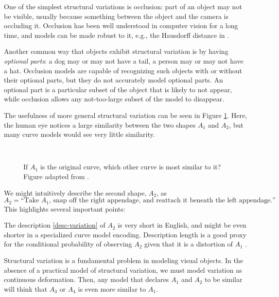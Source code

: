 \documentclass{article}
\begin{document}
One of the simplest structural variations is occlusion: part of an
object may not be visible, usually because something between the
object and the camera is occluding it. Occlusion has been well
understood in computer vision for a long time, and models can be made
robust to it, e.g., the Hausdorff distance in \cite{hausdorff}. 

Another common way that objects exhibit structural variation is by
having \emph{optional parts}: a dog may or may not have a tail, a
person may or may not have a hat. Occlusion models are capable of
recognizing such objects with or without their optional parts, but
they do not accurately model optional parts. An optional part is a
particular subset of the object that is likely to not appear, while
occlusion allows any not-too-large subset of the model to disappear.

The usefulness of more general structural variation can be seen in
Figure \ref{fig-variation}. Here, the human eye notices a large
similarity between the two shapes $A_1$ and $A_2$, but many curve
models would see very little similarity.

\begin{figure}
  \centering
{}
\\
\caption{If $A_1$ is the original curve, which other curve is most
  similar to it? Figure adapted from \cite{basri-jacobs}.}
\label{fig-variation}
\end{figure}

We might intuitively describe the second shape, $A_2$, as
$$ A_2 =\mbox{``Take $A_1$, snap off the right appendage, and reattach
  it beneath the left appendage.''}. \label{desc-variation}$$ 
This highlights several important points:

The description \ref{desc-variation} of $A_2$ is very short in
English, and might be even shorter in a specialized curve model
encoding. Description length is a good proxy for the conditional
probability of observing $A_2$ given that it is a distortion of $A_1$
\cite{potter-geman-bienenstock}.

Structural variation is a fundamental problem in modeling visual
objects. In the absence of a practical model of structural variation,
we must model variation as continuous deformation. Then, any model
that declares $A_1$ and $A_2$ to be similar will think that $A_3$ or
$A_4$ is even more similar to $A_1$.
\end{document}
